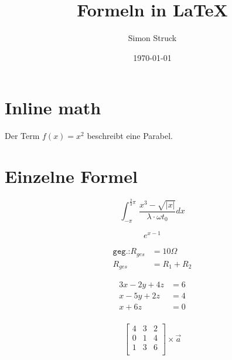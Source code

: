 \documentclass[a4paper,twoside,10pt]{article}
\title{Formeln in \LaTeX}
\author{Simon Struck}
\date{\today}
\begin{document}
	\maketitle
	\newpage
	
	\section{Inline math}
	Der Term $f(x) = x^2$ beschreibt eine Parabel.
	
	\section{Einzelne Formel}
	\begin{equation}
		\int_{-\pi}^{\frac{2}{3}\pi} \frac{x^3-\sqrt{\left|x\right|}}{\lambda \cdot \omega t_0}dx
	\end{equation}
	
	\[
	e^{x-1}
	\]
	
	\begin{align}
	\texttt{geg.:} R_{ges} &= 10 \Omega \\
	R_{ges} &= R_1 + R_2
	\end{align}
	
	\begin{align*}
		3x - 2y + 4z &= 6 \\
		 x - 5y + 2z &= 4 \\
		 x      + 6z &= 0 \\
	\end{align*}
	
	\begin{equation}
		\begin{bmatrix}
			4 & 3 & 2 \\
			0 & 1 & 4 \\
			1 & 3 & 6\\
		\end{bmatrix} \times \vec{a}
	\end{equation}
\end{document}
